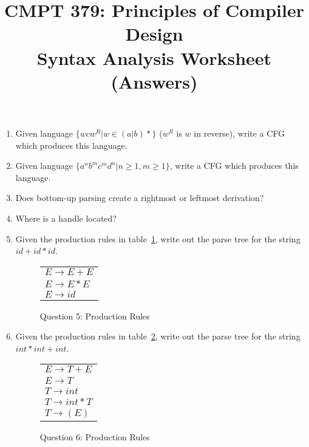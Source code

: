 \documentclass[10pt, oneside, letterpaper]{article}
\title{CMPT 379: Principles of Compiler Design \\\medskip \Large Syntax Analysis Worksheet (Answers)}
\author{}
\date{}
\begin{document}
	\maketitle

	\begin{enumerate}
	
		\item Given language $\bigg\{ wcw^R | w \in (a|b)* \bigg\}$ ($w^R$ is $w$ in reverse), write a CFG which produces this language.
		\vspace{2cm}
		
		\item Given language $\bigg\{ a^n b^m c^m d^n | n \geq 1, m \geq 1 \bigg\}$, write a CFG which produces this language.
		\vspace{2cm}
		
		\item Does bottom-up parsing create a rightmost or leftmost derivation?
		\vspace{2cm}
		
		\item Where is a handle located?
		\vspace{2cm}
		
		\clearpage
		
		\item Given the production rules in table~\ref{tab:q5-prod-rules}, write out the parse tree for the string $id + id * id$.

\begin{figure}[!htb]
	\caption{Question 5: Production Rules}
	\label{tab:q5-prod-rules}
	\begin{center}
		\begin{tabular}{ l }
			$E \rightarrow E + E$ \\
			$E \rightarrow E * E$ \\
			$E \rightarrow id$
		\end{tabular}
	\end{center}
\end{figure}
		
		\clearpage
		
		\item Given the production rules in table~\ref{tab:q6-prod-rules}, write out the parse tree for the string $int * int + int$.

\begin{figure}[!htb]
	\caption{Question 6: Production Rules}
	\label{tab:q6-prod-rules}
	\begin{center}
		\begin{tabular}{ l }
			$E \rightarrow T + E$ \\
			$E \rightarrow T$ \\
			$T \rightarrow int$ \\
			$T \rightarrow int * T$ \\
			$T \rightarrow (E)$
		\end{tabular}
	\end{center}
\end{figure}
		

\end{enumerate}
\end{document}

